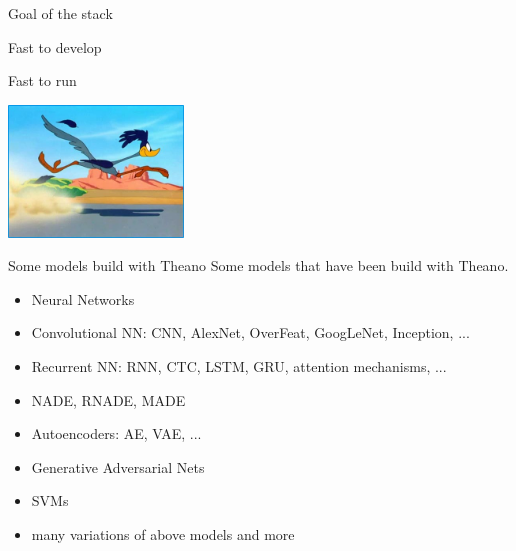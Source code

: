 \documentclass[utf8x,xcolor=pdftex,dvipsnames,table]{beamer}
\begin{document}
\begin{frame}{Goal of the stack}
\begin{center}
\begin{bf}Fast to develop\end{bf}\newline \bigskip
\begin{bf}Fast to run\end{bf}\newline \bigskip
\hspace{-2.5cm}
\includegraphics[width=0.35\textwidth]{pics/road-runner-1.jpg}
\end{center}
\end{frame}

\begin{frame}{Some models build with Theano}
  Some models that have been build with Theano.
  \begin{itemize}
  \item Neural Networks
  \item Convolutional NN: CNN, AlexNet, OverFeat, GoogLeNet, Inception, ...
  \item Recurrent NN: RNN, CTC, LSTM, GRU, attention mechanisms, ...
  \item NADE, RNADE, MADE
  \item Autoencoders: AE, VAE, ...
  \item Generative Adversarial Nets
  \item SVMs
  \item \begin{bf}many variations of above models and more\end{bf}
  \end{itemize}
\end{frame}

\end{document}

